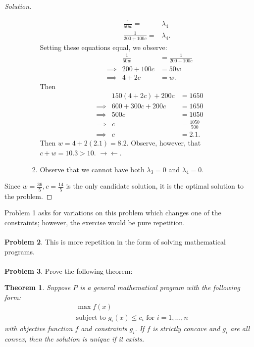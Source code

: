 \documentclass[12pt]{article}
\newtheorem{thm}{Theorem}
\theoremstyle{definition}
\theoremstyle{remark}
\def\la{\lambda}
\begin{document}
\begin{proof}[Solution]
\begin{enumerate}
\begin{enumerate}
\begin{enumerate}
\begin{align*}
        \frac{1}{50w} =& \la_4 \\
        \frac{1}{200+100c} =& \la_4.
      \end{align*}
      Setting these equations equal, we observe:
      \begin{align*}
        &           & \frac{1}{50w} &= \frac{1}{200+100c} \\
        & \implies  & 200+100c &= 50w \\
        & \implies  & 4+2c &= w.
      \end{align*}
      Then
      \begin{align*}
        &           & 150(4+2c) + 200c &= 1650 \\
        & \implies  & 600 + 300c + 200c &= 1650 \\
        & \implies  & 500c &= 1050 \\
        & \implies  & c &= \frac{1050}{500} \\
        & \implies  & c &= 2.1.
      \end{align*}
      Then $w = 4+2(2.1) = 8.2$. Observe, however, that $c+w = 10.3 > 10$. $\rightarrow \leftarrow$.
      \item Observe that we cannot have both $\la_3 = 0$ and $\la_4 = 0$.
    \end{enumerate}
  \end{enumerate}
\end{enumerate}
Since $w = \frac{36}{5}, c = \frac{14}{5}$ is the only candidate solution, it is the optimal solution to the problem.
\end{proof}
Problem 1 asks for variations on this problem which changes one of the constraints; however, the exercise would be pure repetition.
\\ \\
\textbf{Problem 2}. This is more repetition in the form of solving mathematical programs.
\\ \\
\textbf{Problem 3}. Prove the following theorem:
\begin{thm} Suppose $P$ is a general mathematical program with the following form:
\begin{align*}
  &\max f(x) \\
  &\text{subject to } g_i(x) \leq c_i \text{ for } i = 1,\ldots,n
\end{align*}
with objective function $f$ and constraints $g_i$. If $f$ is strictly concave and $g_i$ are all convex, then the solution is unique if it exists.
\end{thm}
\end{document}
